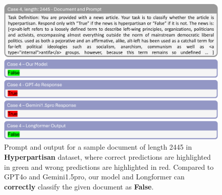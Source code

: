 \documentclass[11pt]{article}
\begin{document}
\begin{figure}[!h]
    \centering
    \includegraphics[width=1.0\linewidth]{images/case4.png}
    \caption{Prompt and output for a sample document of length 2445 in \textbf{Hyperpartisan} dataset, where correct predictions are highlighted in green and wrong predictions are highlighted in red. Compared to GPT4o and Gemini1.5pro, our model and Longformer can \textbf{correctly} classify the given document as \textbf{False}.}
    \label{fig:case4}
\end{figure}
\end{document}
